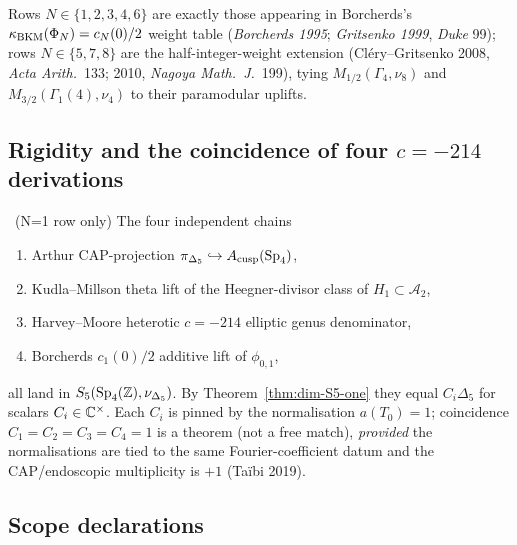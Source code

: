 \medskip\noindent
Rows $N\in\{1,2,3,4,6\}$ are exactly those appearing in Borcherds's
$\kappa_{\mathrm{BKM}}(\Phi_N)=c_N(0)/2$ weight table (\emph{Borcherds 1995};
\emph{Gritsenko 1999}, \emph{Duke} 99); rows $N\in\{5,7,8\}$ are the
half-integer-weight extension (Cl\'ery--Gritsenko 2008,
\emph{Acta Arith.}\ 133; 2010, \emph{Nagoya Math.\ J.}\ 199), tying
$M_{1/2}(\Gamma_4,\nu_8)$ and $M_{3/2}(\Gamma_1(4),\nu_4)$ to their
paramodular uplifts.

\subsection{Rigidity and the coincidence of four $c=-214$ derivations}
\label{subsec:c-minus-214-coincidence}

\begin{proposition}[Four $c=-214$ derivations]
\label{prop:four-c-minus-214}
\ClaimStatusTheorem\ (N=1 row only) The four independent chains
\begin{enumerate}[label=\textup{(\roman*)}]
\item Arthur CAP-projection $\pi_{\Delta_5}\hookrightarrow
A_{\mathrm{cusp}}(\mathrm{Sp}_4)$,
\item Kudla--Millson theta lift of the Heegner-divisor class of
$H_1\subset\mathcal{A}_2$,
\item Harvey--Moore heterotic $c=-214$ elliptic genus denominator,
\item Borcherds $c_1(0)/2$ additive lift of $\phi_{0,1}$,
\end{enumerate}
all land in $S_5(\mathrm{Sp}_4(\mathbb{Z}),\nu_{\Delta_5})$. By
Theorem~\ref{thm:dim-S5-one} they equal $C_i\Delta_5$ for scalars
$C_i\in\mathbb{C}^\times$. Each $C_i$ is pinned by the normalisation
$a(T_0)=1$; coincidence $C_1=C_2=C_3=C_4=1$ is a theorem (not a free
match), \emph{provided} the normalisations are tied to the same
Fourier-coefficient datum and the CAP/endoscopic multiplicity is $+1$
(Ta\"ibi 2019).
\end{proposition}

\subsection{Scope declarations}
\label{subsec:scope-rigidity}

